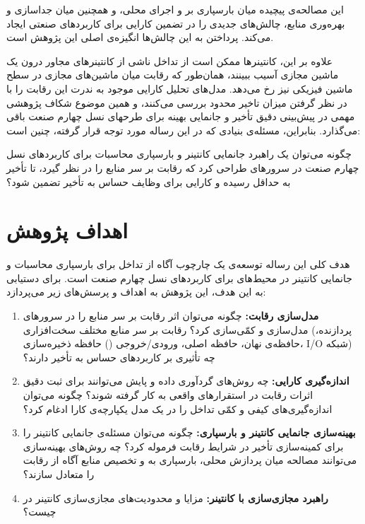 این مصالحه‌ی پیچیده میان بارسپاری بر  و اجرای محلی، و همچنین میان جدا‌سازی و بهره‌وری منابع، چالش‌های جدیدی را در تضمین کارایی برای کاربردهای صنعتی ایجاد می‌کند. پرداختن به این چالش‌ها انگیزه‌ی اصلی این پژوهش است.

علاوه بر این، کانتینرها ممکن است از تداخل ناشی از کانتینرهای مجاور درون یک ماشین مجازی آسیب ببینند، همان‌طور که رقابت میان ماشین‌های مجازی در سطح ماشین فیزیکی نیز رخ می‌دهد. مدل‌های تحلیل کارایی موجود به ندرت این رقابت را با در نظر گرفتن میزان تاخیر محدود بررسی می‌کنند، و همین موضوع شکاف پژوهشی مهمی در پیش‌بینی دقیق تأخیر و جانمایی بهینه برای طرحهای نسل چهارم صنعت باقی می‌گذارد. بنابراین، مسئله‌ی بنیادی که در این رساله مورد توجه قرار گرفته، چنین است:

چگونه می‌توان یک راهبرد جانمایی کانتینر و بارسپاری محاسبات برای کاربردهای نسل چهارم صنعت در سرورهای  طراحی کرد که رقابت بر سر منابع را در نظر گیرد، تا تأخیر به حداقل رسیده و کارایی برای وظایف حساس به تأخیر تضمین شود؟

\section{اهداف پژوهش}

هدف کلی این رساله توسعه‌ی یک چارچوب آگاه از تداخل برای بارسپاری محاسبات و جانمایی کانتینر در محیط‌های  برای کاربردهای نسل چهارم صنعت است. برای دستیابی به این هدف، این پژوهش به اهداف و پرسش‌های زیر می‌پردازد:

\begin{enumerate}
\item
\textbf{مدل‌سازی رقابت:}
چگونه می‌توان اثر رقابت بر سر منابع را در سرورهای  مدل‌سازی و کمّی‌سازی کرد؟
رقابت بر سر منابع مختلف سخت‌افزاری (پردازنده، حافظه‌ی نهان، حافظه اصلی، ورودی/خروجی () حافظه ذخیره‌سازی، I/O شبکه) چه تأثیری بر کاربردهای حساس به تأخیر دارند؟

\item
\textbf{اندازه‌گیری کارایی:}
چه روش‌های گردآوری داده و پایش می‌توانند برای ثبت دقیق اثرات رقابت در استقرارهای واقعی  به کار گرفته شوند؟
چگونه می‌توان اندازه‌گیری‌های کیفی و کمّی تداخل را در یک مدل یکپارچه‌ی کارا ادغام کرد؟

\item
\textbf{بهینه‌سازی جانمایی کانتینر و بارسپاری:}
چگونه می‌توان مسئله‌ی جانمایی کانتینر را برای کمینه‌سازی تأخیر در شرایط رقابت فرموله کرد؟
چه روش‌های بهینه‌سازی می‌توانند مصالحه میان پردازش محلی، بارسپاری به  و تخصیص منابع آگاه از رقابت را متعادل سازند؟

\item
\textbf{راهبرد مجازی‌سازی با کانتینر:}
مزایا و محدودیت‌های مجازی‌سازی کانتینر در  چیست؟

\end{enumerate}

